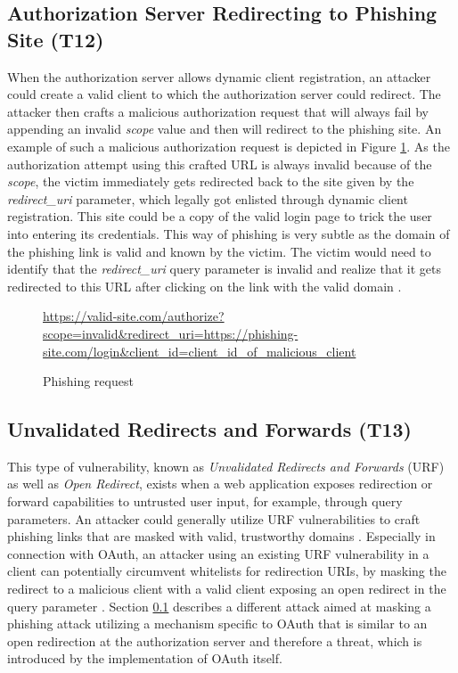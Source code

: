\documentclass[
    fontsize=12pt,
    headings=small,
    parskip=half,           %
    bibliography=totoc,
    numbers=noenddot,       %
    open=any,               %
    ]{scrreprt}
\begin{document}
\subsection[Authorization Server Redirecting to Phishing Site]{Authorization Server Redirecting to Phishing Site (T12)}
\label{threat:T12}
When the authorization server allows dynamic client registration, an attacker could create a valid client to which the authorization server could redirect. The attacker then crafts a malicious authorization request that will always fail by appending an invalid \emph{scope} value and then will redirect to the phishing site. An example of such a malicious authorization request is depicted in Figure \ref{fig:phishing_requests}. As the authorization attempt using this crafted URL is always invalid because of the \emph{scope}, the victim immediately gets redirected back to the site given by the \emph{redirect\_uri} parameter, which legally got enlisted through dynamic client registration. This site could be a copy of the valid login page to trick the user into entering its credentials. This way of phishing is very subtle as the domain of the phishing link is valid and known by the victim. The victim would need to identify that the \emph{redirect\_uri} query parameter is invalid and realize that it gets redirected to this URL after clicking on the link with the valid domain \cite{lodderstedt2020oauth}.


\begin{figure}[ht]
	\sffamily\footnotesize
	\url{https://valid-site.com/authorize?scope=invalid&redirect_uri=https://phishing-site.com/login&client_id=client_id_of_malicious_client}
	\linethickness{0.4pt}
	\caption{Phishing request}
	\label{fig:phishing_requests}
\end{figure}

\subsection[Unvalidated Redirects and Forwards]{Unvalidated Redirects and Forwards (T13)}
\label{threat:T13}
This type of vulnerability, known as \emph{Unvalidated Redirects and Forwards} (URF) as well as \emph{Open Redirect}, exists when a web application exposes redirection or forward capabilities to untrusted user input, for example, through query parameters. An attacker could generally utilize URF vulnerabilities to craft phishing links that are masked with valid, trustworthy domains \cite{wang2015urfds}. Especially in connection with OAuth, an attacker using an existing URF vulnerability in a client can potentially circumvent whitelists for redirection URIs, by masking the redirect to a malicious client with a valid client exposing an open redirect in the query parameter \cite{lodderstedt2020oauth}. Section \ref{threat:T12} describes a different attack aimed at masking a phishing attack utilizing a mechanism specific to OAuth that is similar to an open redirection at the authorization server and therefore a threat, which is introduced by the implementation of OAuth itself.
\end{document}

